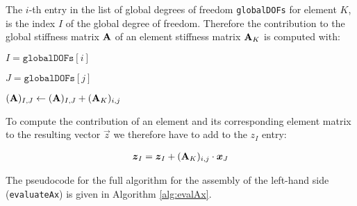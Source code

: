 The $i$-th entry in the list of global degrees of freedom \texttt{globalDOFs} for element $K$, is the index $I$ of the global degree of freedom.
Therefore the contribution to the global stiffness matrix $\mathbf{A}$ of an element stiffness matrix $\mathbf{A}_K$ is computed with:

\begin{algorithm}
     {
        $I = \texttt{globalDOFs}[i]$

         {
            $J = \texttt{globalDOFs}[j]$

            $(\mathbf{A})_{I,J} \gets (\mathbf{A})_{I,J} + (\mathbf{A}_K)_{i,j}$
        }
    }
\end{algorithm}

To compute the contribution of an element and its corresponding element matrix to the resulting vector $\vec{z}$
we therefore have to add to the $z_I$ entry:

\begin{align}
    \boldsymbol{z}_I = \boldsymbol{z}_I + (\mathbf{A}_K)_{i,j} \cdot \boldsymbol{x}_J
\end{align}

The pseudocode for the full algorithm for the assembly of the left-hand side (\texttt{evaluateAx}) is given in Algorithm \ref{alg:evalAx}.

